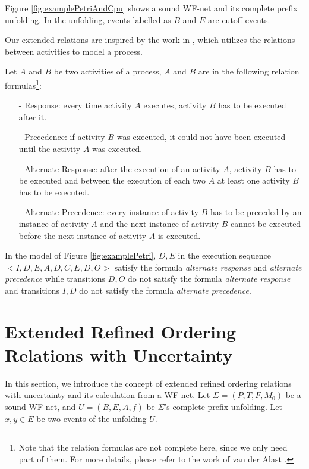 \documentclass{llncs}
\begin{document}
\begin{example}\label{ex:petriAndCpu}
Figure \ref{fig:examplePetriAndCpu} shows a sound WF-net and its complete prefix unfolding. In the unfolding, events labelled as $B$ and $E$ are cutoff events.
\end{example}

Our extended relations are inspired by the work in \cite{van2006decserflow}, which utilizes the relations between activities to model a process.
\begin{definition}\label{def:relationFormulas}
Let $A$ and $B$ be two activities of a process, $A$ and $B$ are in the following relation formulas\footnote{Note that the relation formulas are not complete here, since we only need part of them. For more details, please refer to the work of van der Alast \cite{van2006decserflow}.}:
	\begin{itemize}
		\item[-] Response: every time activity $A$ executes, activity $B$ has to be executed after it.
		\item[-] Precedence: if activity $B$ was executed, it could not have been executed until the activity $A$ was executed.
		\item[-] Alternate Response: after the execution of an activity $A$, activity $B$ has to be executed and between the execution of each two $A$ at least one activity $B$ has to be executed.
		\item[-] Alternate Precedence: every instance of activity $B$ has to be preceded by an instance of activity $A$ and the next instance of activity $B$ cannot be executed before the next instance of activity $A$ is executed.
	\end{itemize}
\end{definition}

\begin{example}\label{ex:relationFormulas}
In the model of Figure \ref{fig:examplePetri}, $D,E$ in the execution sequence $<I,D,E,A,D,C,E,D,O>$ satisfy the formula \textit{alternate response} and \textit{alternate precedence} while transitions $D,O$ do not satisfy the formula \textit{alternate response} and transitions $I,D$ do not satisfy the formula \textit{alternate precedence}.
\end{example}

\section{Extended Refined Ordering Relations with Uncertainty}\label{sec:relations}
In this section, we introduce the concept of extended refined ordering relations with uncertainty and its calculation from a WF-net. Let $\Sigma=(P,T,F,M_{0})$ be a sound WF-net, and $U=(B,E,A,f)$ be $\Sigma$'s complete prefix unfolding. Let $x,y\in E$ be two events of the unfolding $U$.
\end{document}
